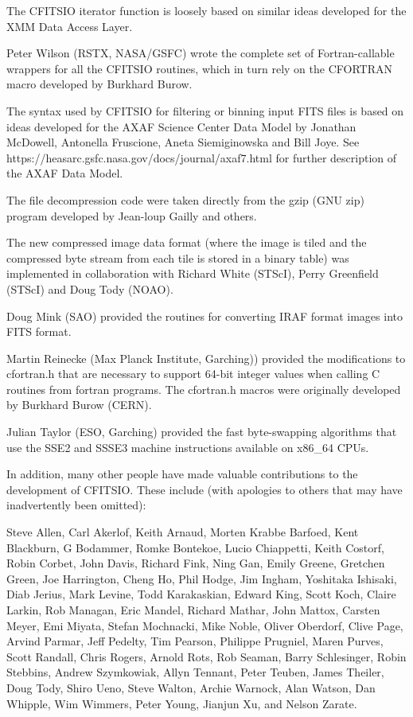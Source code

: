 \documentclass[11pt]{book}
\begin{document}
The CFITSIO iterator function is loosely based on similar ideas
developed for the XMM Data Access Layer.

Peter Wilson (RSTX, NASA/GSFC) wrote the complete set of
Fortran-callable wrappers for all the CFITSIO routines, which in turn
rely on the CFORTRAN macro developed by Burkhard Burow.

The syntax used by CFITSIO for filtering or binning input FITS files is
based on ideas developed for the AXAF Science Center Data Model by
Jonathan McDowell, Antonella Fruscione, Aneta Siemiginowska and Bill
Joye. See https://heasarc.gsfc.nasa.gov/docs/journal/axaf7.html for
further description of the AXAF Data Model.

The file decompression code were taken directly from the gzip (GNU zip)
program developed by Jean-loup Gailly and others.

The new compressed image data format (where the image is tiled and
the compressed byte stream from each tile is stored in a binary table)
was implemented in collaboration with Richard White (STScI), Perry
Greenfield (STScI) and Doug Tody (NOAO).

Doug Mink (SAO) provided the routines for converting IRAF format
images into FITS format.

Martin Reinecke (Max Planck Institute, Garching)) provided the modifications to
cfortran.h that are necessary to support 64-bit integer values when calling
C routines from fortran programs.  The cfortran.h macros were originally developed
by Burkhard Burow (CERN).

Julian Taylor (ESO, Garching) provided the fast byte-swapping algorithms
that use the SSE2 and SSSE3 machine instructions available on x86\_64 CPUs.

In addition, many other people have made valuable contributions to the
development of CFITSIO.  These include (with apologies to others that may
have inadvertently been omitted):

Steve Allen, Carl Akerlof, Keith Arnaud, Morten Krabbe Barfoed, Kent
Blackburn, G Bodammer, Romke Bontekoe, Lucio Chiappetti, Keith Costorf,
Robin Corbet, John Davis,  Richard Fink, Ning Gan, Emily Greene, Gretchen
Green, Joe Harrington, Cheng Ho, Phil Hodge, Jim Ingham, Yoshitaka
Ishisaki, Diab Jerius, Mark Levine, Todd Karakaskian, Edward King,
Scott Koch,  Claire Larkin, Rob Managan, Eric Mandel, Richard Mathar,
John Mattox, Carsten Meyer, Emi Miyata, Stefan Mochnacki, Mike Noble,
Oliver Oberdorf, Clive Page, Arvind Parmar, Jeff Pedelty, Tim Pearson,
Philippe Prugniel, Maren Purves, Scott Randall, Chris Rogers, Arnold Rots,
Rob Seaman, Barry Schlesinger, Robin Stebbins, Andrew Szymkowiak, Allyn Tennant,
Peter Teuben, James Theiler, Doug Tody, Shiro Ueno, Steve Walton, Archie
Warnock, Alan Watson, Dan Whipple, Wim Wimmers, Peter Young, Jianjun Xu,
and Nelson Zarate.
\end{document}
